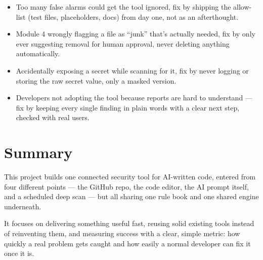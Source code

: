 \documentclass[12pt,a4paper]{article}
\begin{document}
\begin{itemize}
    \item Too many false alarms could get the tool ignored, fix by shipping the allow-list (test files, placeholders, docs) from day one, not as an afterthought.

    \item Module 4 wrongly flagging a file as ``junk'' that's actually needed, fix by only ever suggesting removal for human approval, never deleting anything automatically.

    \item Accidentally exposing a secret while scanning for it, fix by never logging or storing the raw secret value, only a masked version.

    \item Developers not adopting the tool because reports are hard to understand --- fix by keeping every single finding in plain words with a clear next step, checked with real users.
\end{itemize}

\section{Summary}

This project builds one connected security tool for AI-written code, entered from four different points --- the GitHub repo, the code editor, the AI prompt itself, and a scheduled deep scan --- but all sharing one rule book and one shared engine underneath.

It focuses on delivering something useful fast, reusing solid existing tools instead of reinventing them, and measuring success with a clear, simple metric: how quickly a real problem gets caught and how easily a normal developer can fix it once it is.
\end{document}
